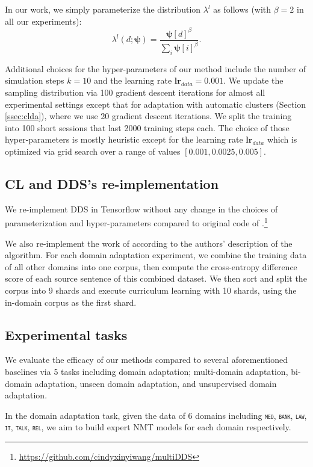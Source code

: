 \documentclass[11pt]{article}
\newcommand{\fyTodo}[1]{\Todo[FY:]{\textcolor{orange}{#1}}}
\newcommand{\domain}[1]{\texttt{\textsc{#1}}}
\newcommand{\vpsi}{\ensuremath{\boldsymbol\psi}\xspace} %
\begin{document}
In our work, we simply parameterize the distribution $\lambda^l$ as follows (with $\beta=2$ in all our experiments):\fyTodo{Explain why}
\begin{equation}
\lambda
^l(d;\vpsi) = \frac{\vpsi[d]^\beta}{\sum_i \vpsi[i]^\beta}. \nonumber
\end{equation}

Additional choices for the hyper-parameters of our method include the number of simulation steps $k=10$ and the learning rate $\mathbf{lr}_{data}=0.001$. We update the sampling distribution via 100 gradient descent iterations for almost all experimental settings except that for adaptation with automatic clusters (Section \ref{ssec:clda}), where we use 20 gradient descent iterations.\fyTodo{Why? computation?} We split the training into 100 short sessions that last 2000 training steps each. The choice of those hyper-parameters is mostly heuristic except for the learning rate $\mathbf{lr}_{data}$ which is optimized via grid search over a range of values $[0.001,0.0025,0.005]$.

\subsection{CL and DDS's re-implementation}\fyTodo{Right place for this ?}
We re-implement DDS in Tensorflow without any change in the choices of parameterization and hyper-parameters compared to original code of \citet{Wang20balancing}.\footnote{\url{https://github.com/cindyxinyiwang/multiDDS}}

We also re-implement the work of \citet{Zhang19curriculum} according to the authors' description of the algorithm. For each domain adaptation experiment, we combine the training data of all other domains into one corpus, then compute the cross-entropy difference score of each source sentence of this combined dataset. We then sort and split the corpus into 9 shards and execute curriculum learning with 10 shards, using the in-domain corpus as the first shard.

\subsection{Experimental tasks}
We evaluate the efficacy of our methods compared to several aforementioned baselines via 5 tasks including domain adaptation; multi-domain adaptation, bi-domain adaptation, unseen domain adaptation, and unsupervised domain adaptation.

In the domain adaptation task, given the data of 6 domains including \domain{med}, \domain{bank}, \domain{law}, \domain{it}, \domain{talk}, \domain{rel}, we aim to build expert NMT models for each domain respectively.
\end{document}
